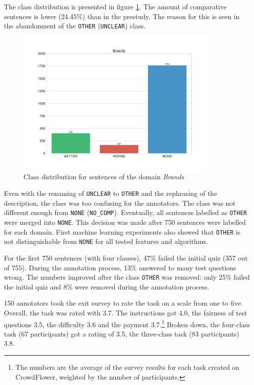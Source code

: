 The class distribution is presented in figure \ref{fig:brands_fin}. The amount of comparative sentences is lower (24.45\%) than in the prestudy. The reason for this is seen in the abandonment of the \texttt{OTHER} (\texttt{UNCLEAR}) class. 

\begin{figure}[h]
\centering
\caption{Class distribution for sentences of the domain \emph{Brands}}
\label{fig:brands_fin}
\includegraphics[width=0.9\textwidth]{images/dataset/Brands-dist}
\end{figure}




Even with the renaming of \texttt{UNCLEAR} to \texttt{OTHER} and the rephrasing of the description, the class was too confusing for the annotators. The class was not different enough from \texttt{NONE} (\texttt{NO\_COMP}). Eventually, all sentences labelled as \texttt{OTHER} were merged into \texttt{NONE}. This decision was made after 750 sentences were labelled for each domain. First machine learning experiments also showed that \texttt{OTHER} is not distinguishable from \texttt{NONE} for all tested features and algorithms.

For the first 750 sentences (with four classes), 47\% failed the initial quiz (357 out of 755). During the annotation process, 13\% answered to many test questions wrong. The numbers improved after the class \texttt{OTHER} was removed: only 25\% failed the initial quiz and 8\% were removed during the annotation process.

150 annotators took the exit survey to rate the task on a scale from one to five. Overall, the task was rated with 3.7. The instructions got 4.0, the fairness of test questions 3.5, the difficulty 3.6 and the payment 3.7.\footnote{The numbers are the average of the survey results for each task created on CrowdFlower, weighted by the number of participants.} Broken down, the four-class task (67 participants) got a rating of 3.5, the three-class task (83 participants) 3.8.


